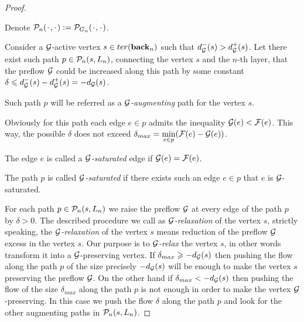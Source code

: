 \documentclass[12pt]{article}
\begin{document}
\begin{proof}
      \begin{definition}
        Denote $\gnpaths(\makebox[1ex]{$\cdot$}, \makebox[1ex]{$\cdot$}) := \cal{P}_{G_n}(\makebox[1ex]{$\cdot$},\makebox[1ex]{$\cdot$})$.
      \end{definition}
      Consider a $\cal{G}$-active vertex $s \in \ter(\eback_n)$ such that $d_{\cal{G}}^{-}(s) > d_{\cal{G}}^{+}(s)$.
      Let there exist such path $p \in \gnpaths(s, L_n)$, connecting the vertex $s$ and the $n$-th layer, that
        the preflow $\cal{G}$ could be increased along this path by some constant
        $\delta \leq d_{\cal{G}}^{-}(s) - d_{\cal{G}}^{+}(s) = -d_{\cal{G}}(s)$.
      \begin{definition}
        Such path $p$ will be referred as a \emph{$\cal{G}$-augmenting} path for the vertex $s$.
      \end{definition}
      Obviously for this path each edge $e \in p$ admits the inequality $\cal{G}(e) < \flowpos(e)$.
      This way, the possible $\delta$ does not exceed $\delta_{max}=\min\limits_{e \in p}(\flowpos(e) - \cal{G}(e))$.
      \begin{definition}
        The edge $e$ is called a \emph{$\cal{G}$-saturated} edge if $\cal{G}(e) = \flowpos(e)$.
      \end{definition}
      \begin{definition}
        The path $p$ is called \emph{$\cal{G}$-saturated} if there exists such an edge $e \in p$ that $e$ is $\cal{G}$-saturated.
      \end{definition}
      For each path $p \in \gnpaths(s, L_n)$ we raise the preflow $\cal{G}$ at every edge of the path $p$
      by $\delta > 0$.
      The described procedure we call as \emph{$\cal{G}$-relaxation} of the vertex $s$, strictly speaking, the \emph{$\cal{G}$-relaxation}
        of the vertex $s$ means reduction of the preflow $\cal{G}$ excess in the vertex $s$.
      Our purpose is to \emph{$\cal{G}$-relax} the vertex $s$, in other words transform it into a $\cal{G}$-preserving vertex.
      If $\delta_{max} \geq -d_{\cal{G}}(s)$ then pushing the flow along the path $p$ of the size precisely $-d_{\cal{G}}(s)$
        will be enough to make the vertex $s$ preserving the preflow $\cal{G}$.
      On the other hand if $\delta_{max} < -d_{\cal{G}}(s)$ then pushing the flow of the size $\delta_{max}$ along the path $p$ is not enough
        in order to make the vertex $\cal{G}$-preserving.
      In this case we push the flow $\delta$ along the path $p$ and look for the other augmenting paths in $\gnpaths(s, L_n)$.

\end{proof}
\end{document}
